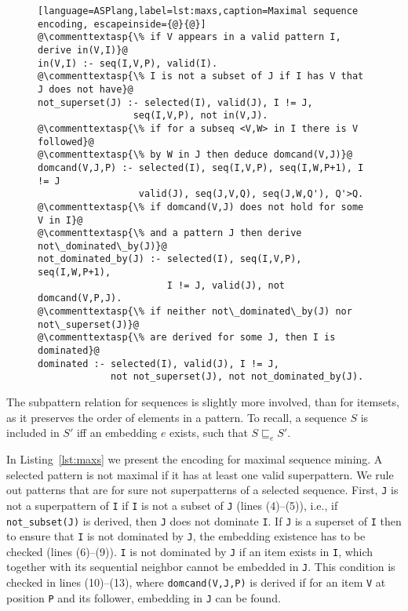 \begin{figure}[t]
\small{ \begin{lstlisting}[language=ASPlang,label=lst:maxs,caption=Maximal sequence encoding, escapeinside={@}{@}]
@\commenttextasp{\% if V appears in a valid pattern I, derive in(V,I)}@
in(V,I) :- seq(I,V,P), valid(I).
@\commenttextasp{\% I is not a subset of J if I has V that J does not have}@
not_superset(J) :- selected(I), valid(J), I != J, 
                 seq(I,V,P), not in(V,J).
@\commenttextasp{\% if for a subseq <V,W> in I there is V followed}@
@\commenttextasp{\% by W in J then deduce domcand(V,J)}@
domcand(V,J,P) :- selected(I), seq(I,V,P), seq(I,W,P+1), I != J
                  valid(J), seq(J,V,Q), seq(J,W,Q'), Q'>Q.
@\commenttextasp{\% if domcand(V,J) does not hold for some V in I}@ 
@\commenttextasp{\% and a pattern J then derive not\_dominated\_by(J)}@
not_dominated_by(J) :- selected(I), seq(I,V,P), seq(I,W,P+1), 
                       I != J, valid(J), not domcand(V,P,J).
@\commenttextasp{\% if neither not\_dominated\_by(J) nor not\_superset(J)}@
@\commenttextasp{\% are derived for some J, then I is dominated}@
dominated :- selected(I), valid(J), I != J, 
             not not_superset(J), not not_dominated_by(J). \end{lstlisting}}
 \end{figure}


\normalsize{ 
The subpattern relation for sequences is slightly more involved, than for itemsets, as it preserves the order of elements in a pattern. To recall, a sequence $S$ is included in $S'$ iff an embedding $e$ exists, such that $S \sqsubseteq_e S'$.}

In Listing~\ref{lst:maxs} we present the encoding for maximal sequence mining. A selected pattern is not maximal if it has at least one valid superpattern. We rule out patterns that are for sure not superpatterns of a selected sequence. First, \texttt{J} is not a superpattern of \texttt{I} if \texttt{I} is not a subset of \texttt{J} (lines (4)--(5)), i.e., if \texttt{not\_subset(J)} is derived, then \texttt{J} does not dominate \texttt{I}. If \texttt{J} is a superset of \texttt{I} then to ensure that \texttt{I} is not dominated by \texttt{J}, the embedding existence has to be checked (lines (6)--(9)). \texttt{I} is not dominated by \texttt{J} if an item exists in \texttt{I}, which together with its sequential neighbor cannot be embedded in \texttt{J}.  This condition is checked in lines (10)--(13), where \texttt{domcand(V,J,P)} is derived if for an item \texttt{V} at position \texttt{P} and its follower, embedding in \texttt{J} can be found. 

